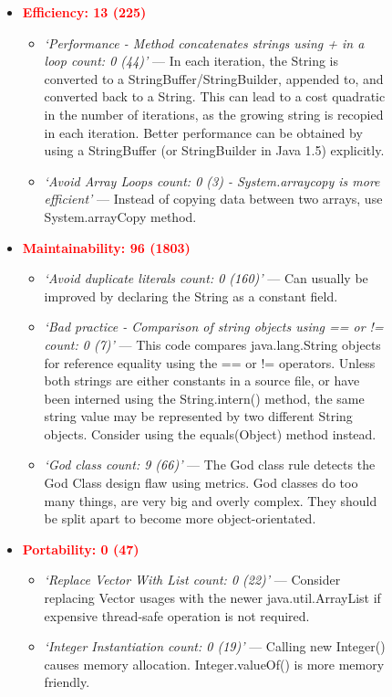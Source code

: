 \mediumlinespacing
\begin{figure}[ptb]
\begin{framed}
\begin{itemize}
    \item \textcolor{red}{\textbf{Efficiency: 13 (225)}}
    \begin{itemize}
        \item \textit{`Performance -  Method concatenates strings using + in a loop count: 0 (44)'} --- In each iteration, the String is converted to a StringBuffer/StringBuilder, appended to, and converted back to a String. This can lead to a cost quadratic in the number of iterations, as the growing string is recopied in each iteration. Better performance can be obtained by using a StringBuffer (or StringBuilder in Java 1.5) explicitly.
        \item \textit{`Avoid Array Loops count: 0 (3) - System.arraycopy is more efficient'} --- Instead of copying data between two arrays, use System.arrayCopy method.
    \end{itemize}

    \item \textcolor{red}{\textbf{Maintainability: 96 (1803)}}
    \begin{itemize}
        \item \textit{`Avoid duplicate literals count: 0 (160)'} --- Can usually be improved by declaring the String as a constant field.
        \item \textit{`Bad practice - Comparison of string objects using == or != count: 0 (7)'} --- This code compares java.lang.String objects for reference equality using the == or != operators. Unless both strings are either constants in a source file, or have been interned using the String.intern() method, the same string value may be represented by two different String objects. Consider using the equals(Object) method instead.
        \item \textit{`God class count: 9 (66)'} --- The God class rule detects the God Class design flaw using metrics. God classes do too many things, are very big and overly complex. They should be split apart to become more object-orientated. 
    \end{itemize}
      
     \item \textcolor{red}{\textbf{Portability: 0 (47)}} 
    \begin{itemize}
        \item \textit{`Replace Vector With List count: 0 (22)'} ---
            Consider replacing Vector usages with the newer 
        java.util.ArrayList if expensive thread-safe operation is not required.
        \item \textit{`Integer Instantiation count: 0 (19)'} --- Calling new Integer() causes memory allocation. Integer.valueOf() is more memory friendly.
    \end{itemize}
    

\end{itemize}
\end{framed}
\end{figure}
